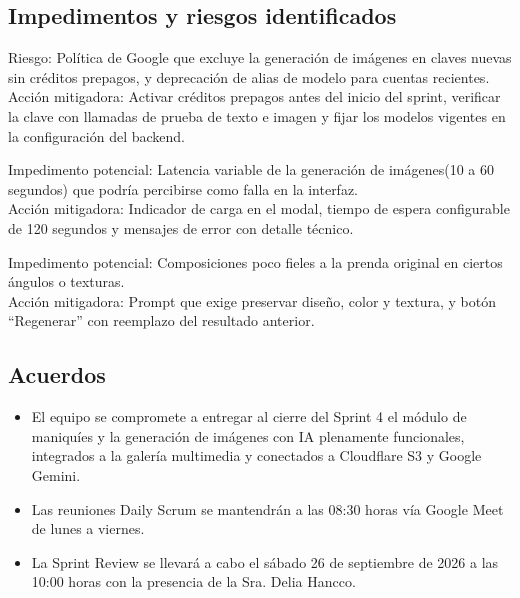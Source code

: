 \documentclass[12pt,a4paper]{article}
\begin{document}
\subsection*{Impedimentos y riesgos identificados}

Riesgo: Política de Google que excluye la generación de imágenes en claves nuevas sin créditos prepagos, y deprecación de alias de modelo para cuentas recientes.\\
Acción mitigadora: Activar créditos prepagos antes del inicio del sprint, verificar la clave con llamadas de prueba de texto e imagen y fijar los modelos vigentes en la configuración del backend.

Impedimento potencial: Latencia variable de la generación de imágenes(10 a 60 segundos) que podría percibirse como falla en la interfaz.\\
Acción mitigadora: Indicador de carga en el modal, tiempo de espera configurable de 120 segundos y mensajes de error con detalle técnico.

Impedimento potencial: Composiciones poco fieles a la prenda original en ciertos ángulos o texturas.\\
Acción mitigadora: Prompt que exige preservar diseño, color y textura, y botón ``Regenerar'' con reemplazo del resultado anterior.

\subsection*{Acuerdos}

\begin{itemize}
    \item El equipo se compromete a entregar al cierre del Sprint 4 el módulo de maniquíes y la generación de imágenes con IA plenamente funcionales, integrados a la galería multimedia y conectados a Cloudflare S3 y Google Gemini.
    \item Las reuniones Daily Scrum se mantendrán a las 08:30 horas vía Google Meet de lunes a viernes.
    \item La Sprint Review se llevará a cabo el sábado 26 de septiembre de 2026 a las 10:00 horas con la presencia de la Sra. Delia Hancco.
\end{itemize}

\end{document}
